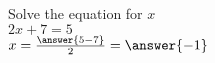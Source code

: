 \documentclass{ximera}
\author{David Kish}
\begin{document}
\begin{exercise}
Solve the equation for $x$\\
$2x+7 = 5$\\
$x=\frac{\answer{5-7}}{2}=\answer{-1}$
\end{exercise}
\end{document}
